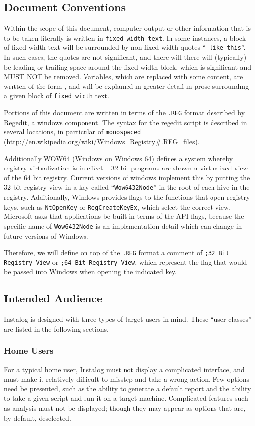 \subsection{Document Conventions}
Within the scope of this document, computer output or other information that is
to be taken literally is written in \texttt{fixed width text}. In some
instances, a block of fixed width text will be surrounded by non-fixed width
quotes ``\texttt{ like this}''. In such cases, the quotes are not significant,
and there will there will (typically) be leading or trailing space around the
fixed width block, which is significant and MUST NOT be removed. Variables,
which are replaced with some content, are written of the form , and
will be explained in greater detail in prose surrounding a given block of
\texttt{fixed width} text.

Portions of this document are written in terms of the \verb|.REG| format
described by Regedit, a windows component. The syntax for the regedit script is
described in several locations, in particular  of \texttt{monospaced}
(\url{http://en.wikipedia.org/wiki/Windows_Registry#.REG_files}).

Additionally WOW64 (Windows on Windows 64) defines a system whereby registry
virtualization is in effect -- 32 bit programs are shown a virtualized view of
the 64 bit registry. Current versions of windows implement this by putting the
32 bit registry view in a key called ``\verb|Wow6432Node|'' in the root of each
hive in the registry. Additionally, Windows provides flags to the functions that open
registry keys, such as \verb|NtOpenKey| or \verb|RegCreateKeyEx|, which select
the correct view. Microsoft asks that applications be built in terms of the API
flags, because the specific name of \verb|Wow6432Node| is an implementation
detail which can change in future versions of Windows.

Therefore, we will define on top of the \verb|.REG| format a comment of
\verb|;32 Bit Registry View| or \verb|;64 Bit Registry View|, which represent
the flag that would be passed into Windows when opening the indicated key.

\subsection{Intended Audience}
Instalog is designed with three types of target users in mind. These ``user
classes'' are listed in the following sections.

\subsubsection{Home Users}
For a typical home user, Instalog must not display a complicated interface, and
must make it relatively difficult to misstep and take a wrong action. Few
options need be presented, such as the ability to generate a default report and
the ability to take a given script and run it on a target machine. Complicated
features such as analysis must not be displayed; though they may appear as
options that are, by default, deselected.

